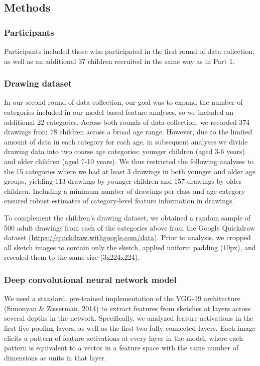 \documentclass[10pt, letterpaper]{article}
\begin{document}
\subsection{Methods}\label{methods-1}

\subsubsection{Participants}\label{participants-1}

Participants included those who participated in the first round of data
collection, as well as an additional 37 children recruited in the same
way as in Part 1.

\subsubsection{Drawing dataset}\label{drawing-dataset}

In our second round of data collection, our goal was to expand the
number of categories included in our model-based feature analyses, so we
included an additional 22 categories. Across both rounds of data
collection, we recorded 374 drawings from 78 children across a broad age
range. However, due to the limited amount of data in each category for
each age, in subsequent analyses we divide drawing data into two coarse
age categories: younger children (aged 3-6 years) and older children
(aged 7-10 years). We thus restricted the following analyses to the 15
categories where we had at least 3 drawings in both younger and older
age groups, yielding 113 drawings by younger children and 157 drawings
by older children. Including a minimum number of drawings per class and
age category ensured robust estimates of category-level feature
information in drawings.

To complement the children's drawing dataset, we obtained a random
sample of 500 adult drawings from each of the categories above from the
Google Quickdraw dataset (\url{https://quickdraw.withgoogle.com/data}).
Prior to analysis, we cropped all sketch images to contain only the
sketch, applied uniform padding (10px), and rescaled them to the same
size (3x224x224).

\subsubsection{Deep convolutional neural network
model}\label{deep-convolutional-neural-network-model}

We used a standard, pre-trained implementation of the VGG-19
architecture (Simonyan \& Zisserman, 2014) to extract features from
sketches at layers across several depths in the network. Specifically,
we analyzed feature activations in the first five pooling layers, as
well as the first two fully-connected layers. Each image elicits a
pattern of feature activations at every layer in the model, where each
pattern is equivalent to a vector in a feature space with the same
number of dimensions as units in that layer.
\end{document}
